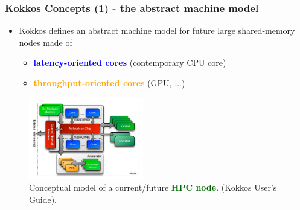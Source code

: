 \begin{frame}
  \frametitle{Kokkos Concepts (1) - the abstract machine model}

  \begin{itemize}
  \item Kokkos defines an abstract machine model for future large shared-memory nodes made of 
    \begin{itemize}
    \item \textcolor{blue}{\textbf{latency-oriented cores}} (contemporary CPU core)
    \item \textcolor{orange}{\textbf{throughput-oriented cores}} (GPU, ...)
    \end{itemize}
  \end{itemize}

  \begin{center}
    \begin{figure}
      \includegraphics[width=5cm]{images/kokkos_machine_model}
      \caption{Conceptual model of a current/future \textcolor{darkgreen}{\bf HPC node}. (Kokkos User's Guide).}
      \end{figure}
  \end{center}

\end{frame}


